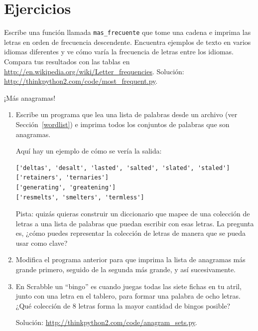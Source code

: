 \documentclass[10pt]{book}
\begin{document}
\section{Ejercicios}

\begin{exercise}

Escribe una función llamada \verb"mas_frecuente" que tome una cadena e
imprima las letras en orden de frecuencia descendente.  Encuentra ejemplos
de texto en varios idiomas diferentes y ve cómo varía la frecuencia de letras
entre los idiomas.  Compara tus resultados con las tablas en
\url{http://en.wikipedia.org/wiki/Letter_frequencies}.  Solución:
\url{http://thinkpython2.com/code/most_frequent.py}.   

\end{exercise}


\begin{exercise}
\label{anagramas}

¡Más anagramas!

\begin{enumerate}

\item Escribe un programa
que lea una lista de palabras desde un archivo (ver Sección~\ref{wordlist}) e
imprima todos los conjuntos de palabras que son anagramas.

Aquí hay un ejemplo de cómo se vería la salida:

\begin{verbatim}
['deltas', 'desalt', 'lasted', 'salted', 'slated', 'staled']
['retainers', 'ternaries']
['generating', 'greatening']
['resmelts', 'smelters', 'termless']
\end{verbatim}
%
Pista: quizás quieras construir un diccionario que mapee de una
colección de letras a una lista de palabras que puedan escribir con esas
letras.  La pregunta es, ¿cómo puedes representar la colección de
letras de manera que se pueda usar como clave?

\item Modifica el programa anterior para que imprima la lista de anagramas
más grande primero, seguido de la segunda más grande, y así sucesivamente.

\item En Scrabble un ``bingo'' es cuando juegas todas las siete fichas en
tu atril, junto con una letra en el tablero, para formar una palabra de ocho
letras.  ¿Qué colección de 8 letras forma la mayor cantidad de bingos posible?


Solución: \url{http://thinkpython2.com/code/anagram_sets.py}.

\end{enumerate}
\end{exercise}
\end{document}
